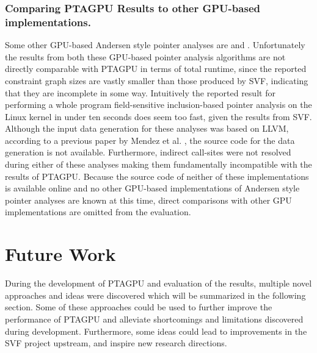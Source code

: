 \subsubsection{Comparing PTAGPU Results to other GPU-based implementations.}
Some other GPU-based Andersen style pointer analyses are \cite{mendez2012gpu} and \cite{su2015efficient}.
Unfortunately the results from both these GPU-based pointer analysis algorithms are not directly comparable with PTAGPU in terms of total runtime, since the reported constraint graph sizes are vastly smaller than those produced by SVF, indicating that they are incomplete in some way. Intuitively the reported result for performing a whole program field-sensitive inclusion-based pointer analysis on the Linux kernel in under ten seconds \cite{su2015efficient} does seem too fast, given the results from SVF.
Although the input data generation for these analyses was based on LLVM, according to a previous paper by Mendez et al. \cite{mendez2010parallel}, the source code for the data generation is not available.
Furthermore, indirect call-sites were not resolved during either of these analyses making them fundamentally incompatible with the results of PTAGPU.
Because the source code of neither of these implementations is available online and no other GPU-based implementations of Andersen style pointer analyses are known at this time, direct comparisons with other GPU implementations are omitted from the evaluation.

\section{Future Work}
During the development of PTAGPU and evaluation of the results, multiple novel approaches and ideas were discovered which will be summarized in the following section.
Some of these approaches could be used to further improve the performance of PTAGPU and alleviate shortcomings and limitations discovered during development.
Furthermore, some ideas could lead to improvements in the SVF project upstream, and inspire new research directions.

